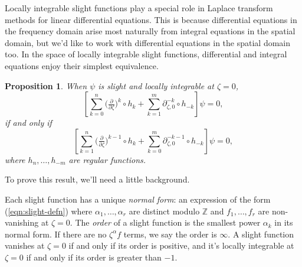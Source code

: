 \documentclass{article}
\theoremstyle{plain}
\newtheorem{prop}{Proposition}
\newcommand{\Z}{\mathbb{Z}}
\newcommand{\fracderiv}[3]{\partial^{#1}_{#2, #3}}
\begin{document}
Locally integrable slight functions play a special role in Laplace transform methods for linear differential equations. This is because differential equations in the frequency domain arise most naturally from integral equations in the spatial domain, but we'd like to work with differential equations in the spatial domain too. In the space of locally integrable slight functions, differential and integral equations enjoy their simplest equivalence.
\begin{prop}\label{prop:shifting}
When $\psi$ is slight and locally integrable at $\zeta = 0$,
\[ \left[ \sum_{k = 0}^n \big(\tfrac{\partial}{\partial \zeta}\big)^k \circ h_k + \sum_{k = 1}^m \fracderiv{-k}{\zeta}{0} \circ h_{-k} \right] \psi = 0, \]
if and only if
\[ \left[ \sum_{k = 1}^n \big(\tfrac{\partial}{\partial \zeta}\big)^{k-1} \circ h_k + \sum_{k = 0}^m \fracderiv{-k-1}{\zeta}{0} \circ h_{-k} \right] \psi = 0, \]
where $h_n, \ldots, h_{-m}$ are regular functions.
\end{prop}
To prove this result, we'll need a little background.

Each slight function has a unique {\em normal form}: an expression of the form (\ref{eqn:slight-defn}) where $\alpha_1, \ldots, \alpha_r$ are distinct modulo $\Z$ and $f_1, \ldots, f_r$ are non-vanishing at $\zeta = 0$. The {\em order} of a slight function is the smallest power $\alpha_k$ in its normal form. If there are no $\zeta^\alpha f$ terms, we say the order is $\infty$. A slight function vanishes at $\zeta = 0$ if and only if its order is positive, and it's locally integrable at $\zeta = 0$ if and only if its order is greater than $-1$.
\end{document}
